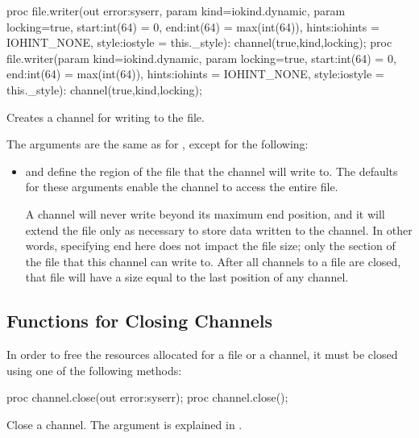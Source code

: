 \begin{protohead}
proc file.writer(out error:syserr, param kind=iokind.dynamic, param locking=true,
                 start:int(64) = 0, end:int(64) = max(int(64)), hints:iohints = IOHINT_NONE,
                 style:iostyle = this._style): channel(true,kind,locking);
proc file.writer(param kind=iokind.dynamic, param locking=true,
                 start:int(64) = 0, end:int(64) = max(int(64)), hints:iohints = IOHINT_NONE,
                 style:iostyle = this._style): channel(true,kind,locking);
\end{protohead}
\begin{protobody}
Creates a channel for writing to the file.

The arguments are the same as for , except for the following:

\begin{itemize}

\item {} and  define the region of the file that
      the channel will write to. The defaults for these arguments enable
      the channel to access the entire file.

      A channel will never write beyond its maximum end position,
      and it will extend the file only as necessary to store data
      written to the channel. In other words, specifying end here
      does not impact the file size; only the section of the file
      that this channel can write to. After all channels to a file
      are closed, that file will have a size equal to the last
      position of any channel.

\end{itemize}

\end{protobody}


\subsection{Functions for Closing Channels}
\label{IO_closing_channels}

In order to free the resources allocated for a file or a channel, it
must be closed using one of the following methods:

\begin{protohead}
proc channel.close(out error:syserr);
proc channel.close();
\end{protohead}
\begin{protobody}
Close a channel.
The  argument is explained in .
\end{protobody}

